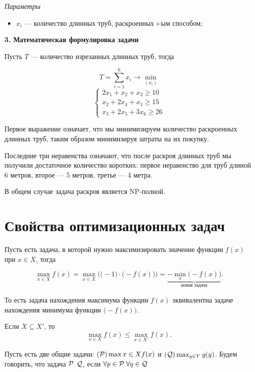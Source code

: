 \bigskip

\textit{Параметры}

\begin{itemize}[nosep]
	\item $x_i$ --- количество длинных труб, раскроенных $i$-ым способом;
\end{itemize}

\bigskip

\textbf{3. Математическая формулировка задачи}

Пусть $T$ --- количество изрезанных длинных труб, тогда

\[
T = \sum_{i=1}^6 x_i \to \min_{(x_i)}
\]
\[
\begin{cases}
	2x_1 + x_2 + x_3 \ge 10 \\
	x_2 + 2x_4 + x_5 \ge 15 \\
	x_3 + 2x_5 + 3x_6 \ge 26
\end{cases}
\]

Первое выражение означает, что мы минимизируем количество раскроенных длинных труб, таким образом минимизируя затраты на их покупку.

Последние три неравенства означают, что после раскроя длинных труб мы получили достаточное количество коротких: первое неравенство для труб длиной 6 метров, второе --- 5 метров, третье --- 4 метра.

\remark

В общем случае задача раскроя является NP-полной.

\section{Свойства оптимизационных задач}


Пусть есть задача, в которой нужно максимизировать значение функции $f(x)$ при $x \in X$, тогда

\[\max_{x \in X} f(x) = \max_{x \in X} \Big(\big(-1\big) \cdot \big(-f(x)\big)\Big) = \underbrace{-\min_x \big(-f(x)\big)}_{\text{новая задача}}.\]

То есть задача нахождения максимума функции $f(x)$ эквивалентна задаче нахождения минимума функции $\big(-f(x)\big)$.


Если $X \subseteq X'$, то
\[
\max_{x \in X} f(x) \le \max_{x \in X'} f(x).
\]


Пусть есть две общие задачи: $(\P) \max{x \in X} f(x)$ и $(\Q) \max_{y \in Y} g(y)$. Будем говорить, что задача $\P$  $\Q$, если $\forall p \in \P \; \forall q \in \Q$

